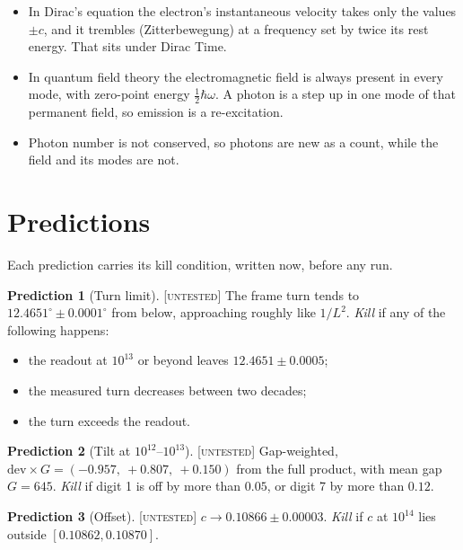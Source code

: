 \documentclass[11pt]{article}
\theoremstyle{definition}
\newtheorem{prediction}{Prediction}
\theoremstyle{remark}
\newcommand{\grade}[1]{\textsc{[#1]}}
\begin{document}
\begin{itemize}
\begin{itemize}
  \item In Dirac's equation the electron's instantaneous velocity takes only the values $\pm c$, and it trembles (Zitterbewegung) at a frequency set by twice its rest energy. That sits under Dirac Time.
  \item In quantum field theory the electromagnetic field is always present in every mode, with zero-point energy $\tfrac12\hbar\omega$. A photon is a step up in one mode of that permanent field, so emission is a re-excitation.
  \item Photon number is not conserved, so photons are new as a count, while the field and its modes are not.
  \end{itemize}
\end{itemize}

\section{Predictions}

\noindent Each prediction carries its kill condition, written now, before any run.

\begin{prediction}[Turn limit] \grade{untested}
The frame turn tends to $12.4651^\circ\pm0.0001^\circ$ from below, approaching roughly like $1/L^2$.
\emph{Kill} if any of the following happens:
\begin{itemize}
\item the readout at $10^{13}$ or beyond leaves $12.4651\pm0.0005$;
\item the measured turn decreases between two decades;
\item the turn exceeds the readout.
\end{itemize}
\end{prediction}

\begin{prediction}[Tilt at $10^{12}$--$10^{13}$] \grade{untested}
Gap-weighted, $\mathrm{dev}\times G=(-0.957,\ +0.807,\ +0.150)$ from the full product, with mean gap $G=645$.
\emph{Kill} if digit 1 is off by more than $0.05$, or digit 7 by more than $0.12$.
\end{prediction}

\begin{prediction}[Offset] \grade{untested}
$c\to0.10866\pm0.00003$.
\emph{Kill} if $c$ at $10^{14}$ lies outside $[0.10862, 0.10870]$.
\end{prediction}
\end{document}
